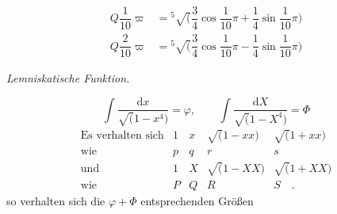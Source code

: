 \[
\begin{aligned}
Q\dfrac1{10}\varpi
&={}^{5}\!\surd(\dfrac34\cos\dfrac1{10}\pi+\dfrac14\sin\dfrac1{10}\pi)\\[5pt]
Q\dfrac2{10}\varpi
&={}^{5}\!\surd(\dfrac34\cos\dfrac1{10}\pi-\dfrac14\sin\dfrac1{10}\pi)
\end{aligned}
\]
\begin{center}\textit{Lemniskatische Funktion.}\end{center}
\[
\int\dfrac{\mathrm{d}x}{\surd(1-x^4)}=\varphi,
\qquad
\int\dfrac{\mathrm{d}X}{\surd(1-X^4)}=\Phi
\]
\[
\begin{array}{rcccc}
\text{Es verhalten sich}&1&x&\surd(1-xx)&\surd(1+xx)\\[5pt]
\text{wie}&p&q&r&s\\[7pt]
\text{und}&1&X&\surd(1-XX)&\surd(1+XX)\\[5pt]
\text{wie}&P&Q&R&S\quad.
\end{array}
\]
\noindent so verhalten sich die $\varphi+\Phi$ entsprechenden Größen


